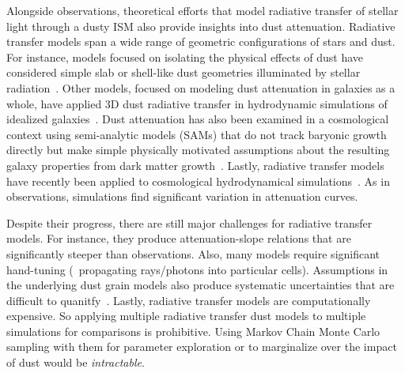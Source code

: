 Alongside observations, theoretical efforts that model radiative transfer of
stellar light through a dusty ISM also provide insights into dust attenuation.
Radiative transfer models span a wide range of geometric configurations of
stars and dust. For instance, models focused on isolating the physical effects
of dust have considered simple slab or shell-like dust geometries illuminated
by stellar radiation~\citep[\eg][]{witt1996, witt2000, seon2016}. Other models,
focused on modeling dust attenuation in galaxies as a whole, have applied 3D
dust radiative transfer in hydrodynamic simulations of idealized
galaxies~\citep[\eg][]{jonsson2006, rocha2008, hayward2015, natale2015,
hou2017}. Dust attenuation has also been examined in a cosmological context
using semi-analytic models (SAMs) that do not track baryonic growth directly 
but make simple physically motivated assumptions about the resulting galaxy
properties from dark matter growth~\citep[\eg][]{granato2000,
fontanot2009, wilkins2012, gonzalez-perez2013}. Lastly, radiative transfer
models have recently been applied to cosmological hydrodynamical
simulations~\cite[\eg][]{camps2015, narayanan2018, trayford2020}. As in
observations, simulations find significant variation in attenuation
curves. %

Despite their progress, there are still major challenges for radiative
transfer models. For instance, they produce attenuation-slope relations that
are significantly steeper than observations. Also, %
many models require significant hand-tuning (\eg~propagating rays/photons into
particular cells). Assumptions in the underlying dust grain models also produce
systematic uncertainties that are difficult to quanitfy~\citep[see][for a
review]{steinacker2013}. Lastly, radiative transfer models 
are computationally expensive. So applying multiple radiative transfer dust
models to multiple simulations for comparisons is prohibitive. Using Markov
Chain Monte Carlo sampling with them for parameter exploration or to marginalize
over the impact of dust would be {\em intractable}. 

